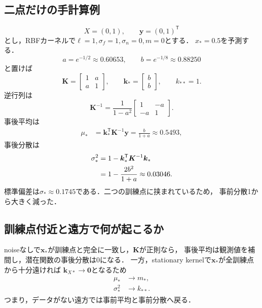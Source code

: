 \documentclass[a4paper,11pt]{ltjsarticle}
\newcommand{\T}{\mathsf T}
\begin{document}
\subsection{二点だけの手計算例}
\label{sec:gpr-numerical-example}

\begin{equation}
  X=(0,1),\qquad \bm y=(0,1)^\T
\end{equation}
とし，RBFカーネルで\(\ell=1,\sigma_f=1,\sigma_n=0,m=0\)とする．
\(x_*=0.5\)を予測する．
\begin{equation}
  a=e^{-1/2}\approx0.60653,
  \qquad b=e^{-1/8}\approx0.88250
\end{equation}
と置けば
\begin{equation}
  \bm K=
  \begin{bmatrix}1&a\\a&1\end{bmatrix},
  \qquad
  \bm k_*=
  \begin{bmatrix}b\\b\end{bmatrix},
  \qquad k_{**}=1.
\end{equation}
逆行列は
\begin{equation}
  \bm K^{-1}
  =\frac{1}{1-a^2}
  \begin{bmatrix}1&-a\\-a&1\end{bmatrix}.
\end{equation}
事後平均は
\begin{align}
  \mu_*
  &=\bm k_*^\T\bm K^{-1}\bm y
  =\frac{b}{1+a}
  \approx0.5493,
\end{align}
事後分散は
\begin{align}
  \sigma_*^2
  &=1-\bm k_*^\T\bm K^{-1}\bm k_*\notag\\
  &=1-\frac{2b^2}{1+a}
  \approx0.03046.
  \label{eq:gpr-numeric-result}
\end{align}
標準偏差は\(\sigma_*\approx0.1745\)である．二つの訓練点に挟まれているため，
事前分散1から大きく減った．

\subsection{訓練点付近と遠方で何が起こるか}

noiseなしで\(\bm x_*\)が訓練点と完全に一致し，\(\bm K\)が正則なら，
事後平均は観測値を補間し，潜在関数の事後分散は0になる．
一方，stationary kernelで\(\bm x_*\)が全訓練点から十分遠ければ
\(\bm k_{X*}\to\bm0\)となるため
\begin{align}
  \mu_*&\to m_*,\\
  \sigma_*^2&\to k_{**}.
\end{align}
つまり，データがない遠方では事前平均と事前分散へ戻る．
\end{document}

